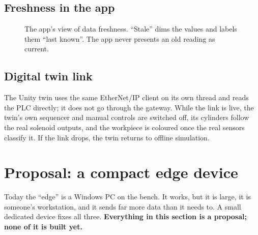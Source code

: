\documentclass[a4paper,10.5pt]{article}
\begin{document}
\subsection{Freshness in the app}
\begin{figure}[H]\centering
{}
\caption{The app's view of data freshness. ``Stale'' dims the values and labels them ``last known''. The app never presents an old reading as current.}
\end{figure}

\subsection{Digital twin link}
The Unity twin uses the same EtherNet/IP client on its own thread and reads the PLC directly; it does not go
through the gateway. While the link is live, the twin's own sequencer and manual controls are switched off,
its cylinders follow the real solenoid outputs, and the workpiece is coloured once the real sensors classify
it. If the link drops, the twin returns to offline simulation.

\section{Proposal: a compact edge device}\label{sec:edge}

Today the ``edge'' is a Windows PC on the bench. It works, but it is large, it is someone's workstation, and
it sends far more data than it needs to. A small dedicated device fixes all three. \textbf{Everything in this
section is a proposal; none of it is built yet.}
\end{document}
